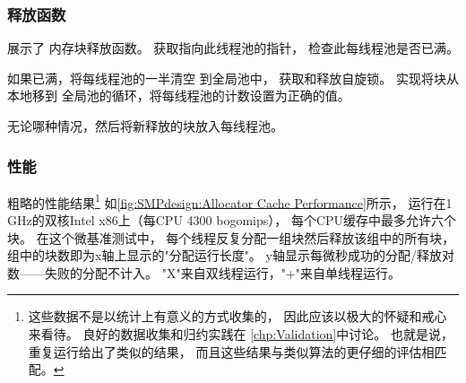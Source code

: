 \begin{listing}

\caption{分配器缓存分配函数}
\label{lst:SMPdesign:Allocator-Cache Allocator Function}
\end{listing}

\subsubsection{释放函数}

\begin{fcvref}
展示了
内存块释放函数。
获取指向此线程池的指针，
检查此每线程池是否已满。

如果已满，将每线程池的一半清空
到全局池中，
获取和释放自旋锁。
实现将块从本地移到
全局池的循环，将每线程池的计数设置为正确的值。

无论哪种情况，然后将新释放的块放入每线程池。
\end{fcvref}

\begin{listing}

\caption{分配器缓存释放函数}
\label{lst:SMPdesign:Allocator-Cache Free Function}
\end{listing}

\QuickQuizEnd

\subsubsection{性能}

粗略的性能结果\footnote{
	这些数据不是以统计上有意义的方式收集的，
	因此应该以极大的怀疑和戒心来看待。
	良好的数据收集和归约实践在
	\cref{chp:Validation}中讨论。
	也就是说，重复运行给出了类似的结果，
	而且这些结果与类似算法的更仔细的评估相匹配。}
如\cref{fig:SMPdesign:Allocator Cache Performance}所示，
运行在1\,GHz的双核Intel x86上（每CPU 4300 bogomips），
每个CPU缓存中最多允许六个块。
在这个微基准测试中，
每个线程反复分配一组块然后释放该组中的所有块，
组中的块数即为x轴上显示的"分配运行长度"。
y轴显示每微秒成功的分配/释放对数——失败的分配不计入。
"X"来自双线程运行，"+"来自单线程运行。

